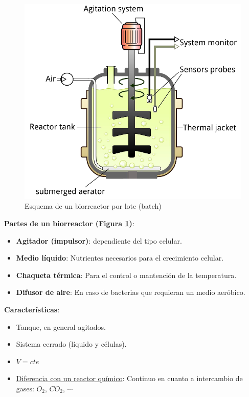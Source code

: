     \begin{multicols}{2}
        \begin{figure}
            \centering
            \includegraphics[width=\textwidth]{img/esquemas/cultivo_batch.png}
            \caption{Esquema de un biorreactor por lote (batch)}
            \label{fig:cultivo_batch}
        \end{figure}
        \textbf{Partes de un biorreactor (Figura \ref{fig:cultivo_batch})}:
        \begin{itemize}
            \item \textbf{Agitador (impulsor)}: dependiente del tipo celular.
            \item \textbf{Medio líquido}: Nutrientes necesarios para el crecimiento celular.
            \item \textbf{Chaqueta térmica}: Para el control o mantención de la temperatura.
            \item \textbf{Difusor de aire}: En caso de bacterias que requieran un medio aeróbico.
        \end{itemize}
        
        \textbf{Características}:
        \begin{itemize}
            \item Tanque, en general agitados.
            \item Sistema cerrado (líquido y células).
            \item \(V = cte\)
            \item \underline{Diferencia con un reactor químico}: Continuo en cuanto a intercambio de gases: \(O_{2}\), \(C{O}_{2}\), \(\cdots\)
        \end{itemize}
    \end{multicols}
    
